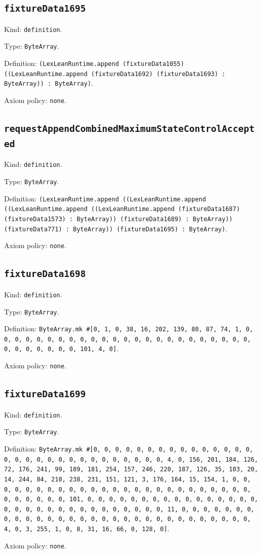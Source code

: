 \documentclass[11pt]{article}
\begin{document}
\subsection*{\texttt{fixtureData1695}}
\noindent Kind: \texttt{definition}.\par
\noindent Type: \texttt{ByteArray}.\par
\noindent Definition: \texttt{(LexLeanRuntime.append (fixtureData1055) ((LexLeanRuntime.append (fixtureData1692) (fixtureData1693) : ByteArray)) : ByteArray)}.\par
\noindent Axiom policy: \texttt{none}.\par
\subsection*{\texttt{requestAppendCombinedMaximumStateControlAccepted}}
\noindent Kind: \texttt{definition}.\par
\noindent Type: \texttt{ByteArray}.\par
\noindent Definition: \texttt{(LexLeanRuntime.append ((LexLeanRuntime.append ((LexLeanRuntime.append ((LexLeanRuntime.append (fixtureData1687) (fixtureData1573) : ByteArray)) (fixtureData1689) : ByteArray)) (fixtureData771) : ByteArray)) (fixtureData1695) : ByteArray)}.\par
\noindent Axiom policy: \texttt{none}.\par
\subsection*{\texttt{fixtureData1698}}
\noindent Kind: \texttt{definition}.\par
\noindent Type: \texttt{ByteArray}.\par
\noindent Definition: \texttt{ByteArray.mk \#[0, 1, 0, 38, 16, 202, 139, 80, 87, 74, 1, 0, 0, 0, 0, 0, 0, 0, 0, 0, 0, 0, 0, 0, 0, 0, 0, 0, 0, 0, 0, 0, 0, 0, 0, 0, 0, 0, 0, 0, 0, 0, 101, 4, 0]}.\par
\noindent Axiom policy: \texttt{none}.\par
\subsection*{\texttt{fixtureData1699}}
\noindent Kind: \texttt{definition}.\par
\noindent Type: \texttt{ByteArray}.\par
\noindent Definition: \texttt{ByteArray.mk \#[0, 0, 0, 0, 0, 0, 0, 0, 0, 0, 0, 0, 0, 0, 0, 0, 0, 0, 0, 0, 0, 0, 0, 0, 0, 0, 0, 0, 0, 0, 4, 0, 156, 201, 184, 126, 72, 176, 241, 99, 189, 181, 254, 157, 246, 220, 187, 126, 35, 103, 20, 14, 244, 84, 210, 238, 231, 151, 121, 3, 176, 164, 15, 154, 1, 0, 0, 0, 0, 0, 0, 0, 0, 0, 0, 0, 0, 0, 0, 0, 0, 0, 0, 0, 0, 0, 0, 0, 0, 0, 0, 0, 0, 0, 0, 0, 101, 0, 0, 0, 0, 0, 0, 0, 0, 0, 0, 0, 0, 0, 0, 0, 0, 0, 0, 0, 0, 0, 0, 0, 0, 0, 0, 0, 0, 0, 0, 0, 11, 0, 0, 0, 0, 0, 0, 0, 0, 0, 0, 0, 0, 0, 0, 0, 0, 0, 0, 0, 0, 0, 0, 0, 0, 0, 0, 0, 0, 0, 0, 4, 0, 3, 255, 1, 0, 8, 31, 16, 66, 0, 128, 0]}.\par
\noindent Axiom policy: \texttt{none}.\par
\end{document}
